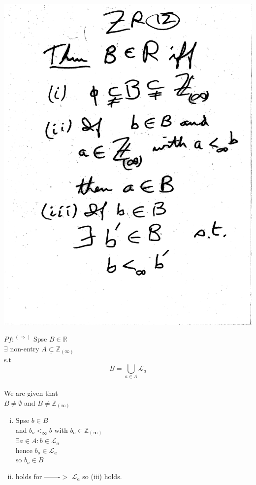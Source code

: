 \documentclass[10pt,a4paper]{article}
\begin{document}
{{\begin{enumerate}[(i)]
\includegraphics[scale=.5]{Pages/ZR_12}
\end{enumerate}

\newpage

$\underline{Pf:}^{(\Rightarrow)}$ Spse $B \in \mathbb{R}$
\\ $\exists$ non-entry $A \underline{\subset} \mathbb{Z}_{(\infty)}$
\\ s.t $$B=\bigcup_{a \in A} \mathcal{L}_a$$
\\ We are given that
\\ $B \neq \emptyset$ and $B \neq \mathbb{Z}_{(\infty)}$ 
\begin{enumerate}[(ii)] 
\item Spse $b \in B$
\\ and $b_o <_\infty b$ with $b_o \in \mathbb{Z}_{(\infty)}$
\\ $\exists a \in A: b \in \mathcal{L}_a$
\\hence $b_o \in \mathcal{L}_a$
\\ so $b_o \in B$
\item holds for -------$>$ $\mathcal{L}_a$ so (iii) holds. 


\end{enumerate}}}
\end{document}
